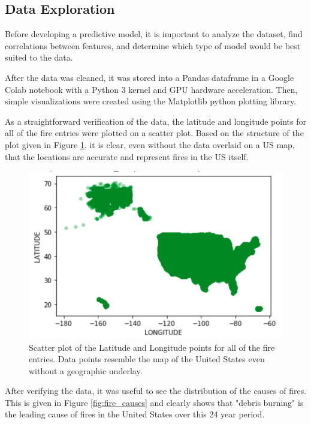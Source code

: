 \documentclass[conference]{IEEEtran}
\begin{document}
\subsection{Data Exploration}
Before developing a predictive model, it is important to analyze the dataset, find correlations between features, and determine which type of model would be best suited to the data. \par

After the data was cleaned, it was stored into a Pandas dataframe in a Google Colab notebook with a Python 3 kernel and GPU hardware acceleration. Then, simple visualizations were created using the Matplotlib python plotting library. \par

As a straightforward verification of the data, the latitude and longitude points for all of the fire entries were plotted on a scatter plot. Based on the structure of the plot given in Figure \ref{fig:fire_scatter}, it is clear, even without the data overlaid on a US map, that the locations are accurate and represent fires in the US itself.

\begin{figure}
    \centering
    \includegraphics{img/fire_scatter.PNG}
    \caption{Scatter plot of the Latitude and Longitude points for all of the fire entries. Data points resemble the map of the United States even without a geographic underlay.}
    \label{fig:fire_scatter}
\end{figure}

After verifying the data, it was useful to see the distribution of the causes of fires. This is given in Figure \ref{fig:fire_causes} and clearly shows that "debris burning" is the leading cause of fires in the United States over this 24 year period.
\end{document}
